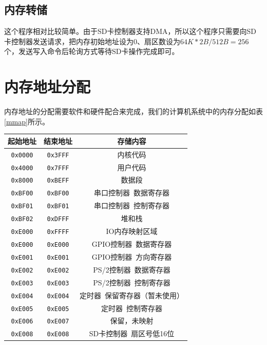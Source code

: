 \documentclass[11pt,utf8]{report}
\begin{document}
\subsection{内存转储}
	\par 这个程序相对比较简单。由于SD卡控制器支持DMA，所以这个程序只需要向SD卡控制器发送请求，把内存初始地址设为0、扇区数设为$64K * 2B / 512B = 256$个，发送写入命令后轮询方式等待SD卡操作完成即可。

\section{内存地址分配}

内存地址的分配需要软件和硬件配合来完成，我们的计算机系统中的内存分配如表\ref{mmap}所示。

\begin{table}[H]
\centering
\begin{tabular}{c|c|c}
\toprule[1.2pt]
\textbf{起始地址} & \textbf{结束地址} & \textbf{存储内容} \\
\midrule[1.2pt]
\texttt{0x0000} & \texttt{0x3FFF} & 内核代码 \\ \hline
\texttt{0x4000} & \texttt{0x7FFF} & 用户代码 \\ \hline
\texttt{0x8000} & \texttt{0xBEFF} & 数据段 \\ \hline
\texttt{0xBF00} & \texttt{0xBF00} & 串口控制器~数据寄存器 \\ \hline
\texttt{0xBF01} & \texttt{0xBF01} & 串口控制器~控制寄存器 \\ \hline
\texttt{0xBF02} & \texttt{0xDFFF} & 堆和栈 \\ \hline
\texttt{0xE000} & \texttt{0xFFFF} & IO内存映射区域 \\ \hline
\texttt{0xE000} & \texttt{0xE000} & GPIO控制器~数据寄存器 \\ \hline
\texttt{0xE001} & \texttt{0xE001} & GPIO控制器~方向寄存器 \\ \hline
\texttt{0xE002} & \texttt{0xE002} & PS/2控制器~数据寄存器 \\ \hline
\texttt{0xE003} & \texttt{0xE003} & PS/2控制器~控制寄存器 \\ \hline
\texttt{0xE004} & \texttt{0xE004} & 定时器~保留寄存器（暂未使用） \\ \hline
\texttt{0xE005} & \texttt{0xE005} & 定时器~控制寄存器 \\ \hline
\texttt{0xE006} & \texttt{0xE007} & 保留，未映射 \\ \hline
\texttt{0xE008} & \texttt{0xE008} & SD卡控制器~扇区号低16位 \\ \hline

\end{tabular}
\end{table}
\end{document}
